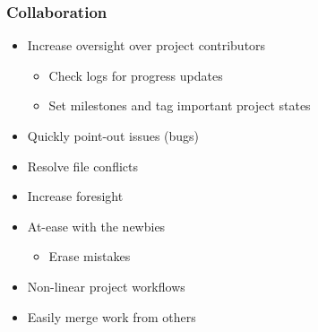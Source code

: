 \begin{frame}\frametitle{Collaboration}
    \begin{itemize}
        \item Increase oversight over project contributors
        \begin{itemize}
            \item Check logs for progress updates
            \item Set milestones and tag important project
            states
        \end{itemize}
        \item Quickly point-out issues (bugs)
        \item Resolve file conflicts
        \item Increase foresight
        \item At-ease with the newbies
        \begin{itemize}
            \item Erase mistakes
        \end{itemize}
        \item Non-linear project workflows
        \item Easily merge work from others
    \end{itemize}
\end{frame}